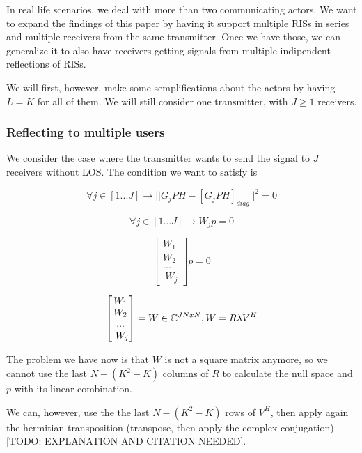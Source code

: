 In real life scenarios, we deal with more than two communicating actors. We want to expand the findings of this paper by having it support multiple RISs in series and multiple receivers from the same transmitter. Once we have those, we can generalize it to also have receivers getting signals from multiple indipendent reflections of RISs.

We will first, however, make some semplifications about the actors by having $L = K$ for all of them. We will still consider one transmitter, with $J \ge 1$ receivers.

\subsubsection{Reflecting to multiple users}

We consider the case where the transmitter wants to send the signal to $J$ receivers without LOS. The condition we want to satisfy is

\begin{equation}
  \forall j \in [1...J] \rightarrow || G_jPH - [G_jPH]_{diag} || ^2 = 0
\end{equation}

\begin{equation}
  \forall j \in [1...J] \rightarrow W_jp = 0
\end{equation}

\begin{equation}
  \begin{bmatrix}
    W_1  \\
    W_ 2 \\
    ...  \\\
    W_j
  \end{bmatrix}
  p = 0
\end{equation}

\begin{equation}
  \begin{bmatrix}
    W_1  \\
    W_ 2 \\
    ...  \\\
    W_j
  \end{bmatrix}
  = W \in \mathbb{C} ^ {JNxN}, W = R \lambda V^H
\end{equation}

The problem we have now is that $W$ is not a square matrix anymore, so we cannot use the last $N - (K^2 - K)$ columns of $R$ to calculate the null space and $p$ with its linear combination.

We can, however, use the the last $N - (K^2 - K)$ rows of $V^H$, then apply again the hermitian transposition (transpose, then apply the complex conjugation) [TODO: EXPLANATION AND CITATION NEEDED].

